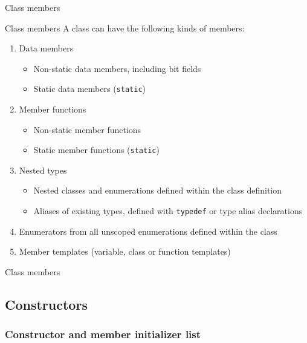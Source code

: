 \begin{frame}{Class members}{}
  \begin{block}{Class members}
    A class can have the following kinds of members:
    \begin{enumerate}
    \item
      Data members
      \begin{itemize}
      \item
        Non-static data members, including bit fields
      \item
        Static data members (\lstinline!static!)
      \end{itemize}
    \item
      Member functions
      \begin{itemize}
      \item
        Non-static member functions
      \item
        Static member functions (\lstinline!static!)
      \end{itemize}
    \item
      Nested types
      \begin{itemize}
      \item
        Nested classes and enumerations defined within the class definition
      \item
        Aliases of existing types, defined with \lstinline!typedef! or type alias declarations
      \end{itemize}
    \item
      Enumerators from all unscoped enumerations defined within the class
    \item
      Member templates (variable, class or function templates)
    \end{enumerate}
  \end{block}
\end{frame}

\begin{frame}{Class members}{}
  \begin{example}
  \end{example}
\end{frame}


\subsection{Constructors}

\subsubsection{Constructor and member initializer list}

